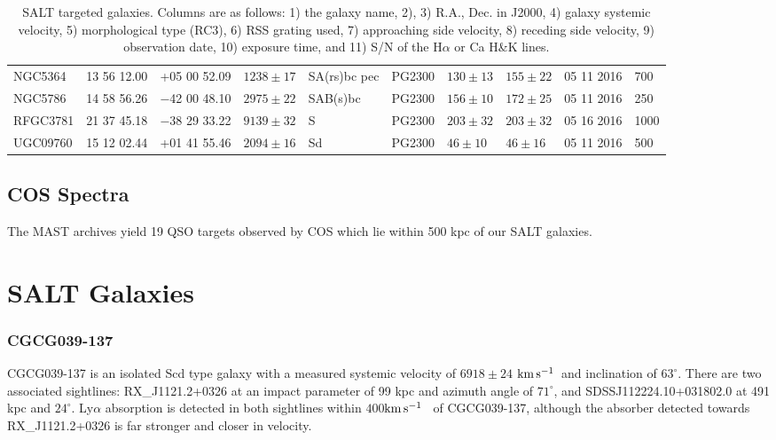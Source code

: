 \documentclass[iop]{emulateapj-rtx4}
\newcommand{\kms}{$\rm km\, s^{-1}$}
\begin{document}
\begin{table}[ht]
\begin{center}
\begin{tabular}{l l l l l l l l l l}
 NGC5364	 	& 13 56 12.00		& +05 00 52.09		& $1238 \pm17$	& SA(rs)bc pec	& PG2300		& $130 \pm 13$	& $155 \pm 22$		& 05 11 2016	& 700			\\ %
 
 NGC5786	 	& 14 58 56.26		& $-$42 00 48.10	& $2975 \pm22$	& SAB(s)bc	& PG2300		& $156 \pm 10$	& $172 \pm 25$		& 05 11 2016	& 250			\\ %

 RFGC3781	 	& 21 37 45.18		& $-$38 29 33.22	& $9139 \pm32$	& S			& PG2300		& $203 \pm 32$	& $203 \pm 32$		& 05 16 2016	& 1000			\\ %

 UGC09760	 	& 15 12 02.44		& +01 41 55.46		& $2094 \pm16$	& Sd			& PG2300		& $46 \pm 10$		& $46 \pm 16$			& 05 11 2016	& 500			\\


 \hline

\end{tabular}
\end{center}
  \caption{\small{SALT targeted galaxies. Columns are as follows: 1) the galaxy name, 2), 3) R.A., Dec. in J2000, 4) galaxy systemic velocity, 5) morphological type (RC3), 6) RSS grating used, 7) approaching side velocity, 8) receding side velocity, 9) observation date, 10) exposure time, and 11) S/N of the H$\alpha$ or Ca H\&K lines.}}
  \label{salt_targets}
\end{table}

\subsection{COS Spectra}
The MAST archives yield 19 QSO targets observed by COS which lie within 500 kpc of our SALT galaxies. 

\section{SALT Galaxies}

\subsubsection{CGCG039-137}

CGCG039-137 is an isolated Scd type galaxy with a measured systemic velocity of $6918 \pm 24$ \kms~and inclination of $63^{\circ}$. There are two associated sightlines: RX\_J1121.2+0326 at an impact parameter of 99 kpc and azimuth angle of $71^{\circ}$, and SDSSJ112224.10+031802.0 at 491 kpc and $24^{\circ}$. Ly$\alpha$ absorption is detected in both sightlines within $400$\kms~ of CGCG039-137, although the absorber detected towards RX\_J1121.2+0326 is far stronger and closer in velocity. 
\end{document}
